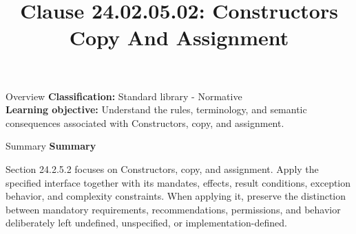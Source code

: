 \documentclass[10pt,letterpaper]{article}
\title{Clause 24.02.05.02: Constructors Copy And Assignment}
\author{}
\date{}
\begin{document}
\maketitle
\begin{CornellOverviewBox}{Overview}
\textbf{Classification:} Standard library - Normative\\[2pt]
\textbf{Learning objective:} Understand the rules, terminology, and semantic consequences associated with Constructors, copy, and assignment.
\end{CornellOverviewBox}\begin{CornellSummaryBox}{Summary}
{\sffamily\bfseries\color{Accent} Summary}\par\vspace{3pt}Section 24.2.5.2 focuses on Constructors, copy, and assignment. Apply the specified interface together with its mandates, effects, result conditions, exception behavior, and complexity constraints. When applying it, preserve the distinction between mandatory requirements, recommendations, permissions, and behavior deliberately left undefined, unspecified, or implementation-defined.
\end{CornellSummaryBox}
\end{document}
